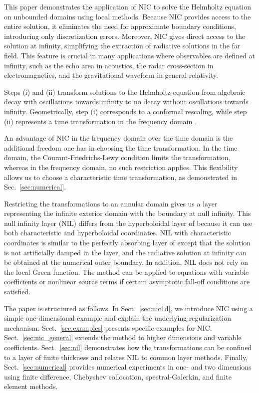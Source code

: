\documentclass[onefignum,onetabnum]{siamart190516}
\begin{document}
This paper demonstrates the application of NIC to solve the Helmholtz equation on unbounded domains using local methods. Because NIC provides access to the entire solution, it eliminates the need for approximate boundary conditions, introducing only discretization errors. Moreover, NIC gives direct access to the solution at infinity, simplifying the extraction of radiative solutions in the far field. This feature is crucial in many applications where observables are defined at infinity, such as the echo area in acoustics, the radar cross-section in electromagnetics, and the gravitational waveform in general relativity.

Steps (i) and (ii) transform solutions to the Helmholtz equation from algebraic decay with oscillations towards infinity to no decay without oscillations towards infinity. Geometrically, step (i) corresponds to a conformal rescaling, while step (ii) represents a time transformation in the frequency domain \cite{ZengFramework}. 

An advantage of NIC in the frequency domain over the time domain is the additional freedom one has in choosing the time transformation. In the time domain, the Courant-Friedrichs-Lewy condition limits the transformation, whereas in the frequency domain, no such restriction applies. This flexibility allows us to choose a characteristic time transformation, as demonstrated in Sec.~\ref{sec:numerical}.

Restricting the transformations to an annular domain gives us a layer representing the infinite exterior domain with the boundary at null infinity. This null infinity layer (NIL) differs from the hyperboloidal layer of \cite{ZENGINOGLU20112286} because it can use both characteristic and hyperboloidal coordinates. NIL with characteristic coordinates is similar to the perfectly absorbing layer of \cite{wang2017perfect, yang2021truly} except that the solution is not artificially damped in the layer, and the radiative solution at infinity can be obtained at the numerical outer boundary. In addition, NIL does not rely on the local Green function. The method can be applied to equations with variable coefficients or nonlinear source terms if certain asymptotic fall-off conditions are satisfied. 

The paper is structured as follows. In Sect.~\ref{sec:nic1d}, we introduce NIC using a simple one-dimensional example and explain the underlying regularization mechanism. Sect.~\ref{sec:examples} presents specific examples for NIC. Sect.~\ref{sec:nic_general} extends the method to higher dimensions and variable coefficients.
Sect.~\ref{sec:nil} demonstrates how the transformations can be confined to a layer of finite thickness and relates NIL to common layer methods. Finally, Sect.~\ref{sec:numerical} provides numerical experiments in one- and two dimensions using finite difference, Chebyshev collocation, spectral-Galerkin, and finite element methods.
\end{document}
